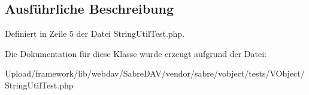 \subsection{Ausführliche Beschreibung}


Definiert in Zeile 5 der Datei String\+Util\+Test.\+php.



Die Dokumentation für diese Klasse wurde erzeugt aufgrund der Datei\+:\begin{DoxyCompactItemize}
\item 
Upload/framework/lib/webdav/\+Sabre\+D\+A\+V/vendor/sabre/vobject/tests/\+V\+Object/String\+Util\+Test.\+php\end{DoxyCompactItemize}
